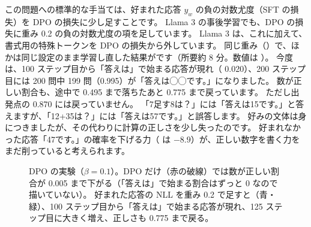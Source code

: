 この問題への標準的な手当ては、好まれた応答 $y_w$ の負の対数尤度（SFT の損失）を DPO の損失に少し足すことです。
Llama 3 の事後学習でも、DPO の損失に重み 0.2 の負の対数尤度の項を足しています\cite{dubey2024llama3}。
Llama 3 は、これに加えて、書式用の特殊トークンを DPO の損失から外しています。
同じ重み（）で、ほかは同じ設定のまま学習し直した結果がです（所要約 8 分。数値は ）。
今度は、100 ステップ目から「答えは」で始まる応答が現れ（ 0.020）、200 ステップ目には 200 問中 199 問（0.995）が「答えは◯◯です。」になりました。
数が正しい割合も、途中で 0.495 まで落ちたあと 0.775 まで戻っています。
ただし出発点の 0.870 には戻っていません。
「7足す8は？」には「答えは15です。」と答えますが、「12+35は？」には「答えは57です。」と誤答します。
好みの文体は身につきましたが、その代わりに計算の正しさを少し失ったのです。
好まれなかった応答「47です。」の確率を下げる力（ は $-8.9$）が、正しい数字を書く力をまだ削っていると考えられます。

\begin{figure}[tbp]
\centering
{}
\caption{DPO の実験（$\beta=0.1$）。DPO だけ（赤の破線）では数が正しい割合が 0.005 まで下がる（「答えは」で始まる割合はずっと 0 なので描いていない）。
好まれた応答の NLL を重み 0.2 で足すと（青・緑）、100 ステップ目から「答えは」で始まる応答が現れ、125 ステップ目に大きく増え、正しさも 0.775 まで戻る。}
\label{fig:rl-dpo-curves}
\end{figure}

